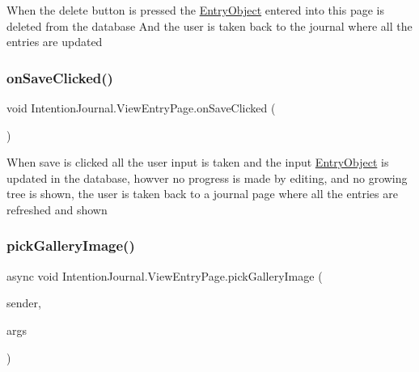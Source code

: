 When the delete button is pressed the \hyperlink{class_intention_journal_1_1_entry_object}{Entry\+Object} entered into this page is deleted from the database And the user is taken back to the journal where all the entries are updated 

\mbox{\label{class_intention_journal_1_1_view_entry_page_a42744fad9ae25e4b10a7a308e69545ce}} 
\subsubsection{\texorpdfstring{on\+Save\+Clicked()}{onSaveClicked()}}
{\footnotesize\ttfamily void Intention\+Journal.\+View\+Entry\+Page.\+on\+Save\+Clicked (\begin{DoxyParamCaption}{ }\end{DoxyParamCaption})\hspace{0.3cm}{\ttfamily [inline]}}



When save is clicked all the user input is taken and the input \hyperlink{class_intention_journal_1_1_entry_object}{Entry\+Object} is updated in the database, howver no progress is made by editing, and no growing tree is shown, the user is taken back to a journal page where all the entries are refreshed and shown 

\mbox{\label{class_intention_journal_1_1_view_entry_page_a2f172c5cd22210438c6c671a8c59022b}} 
\subsubsection{\texorpdfstring{pick\+Gallery\+Image()}{pickGalleryImage()}}
{\footnotesize\ttfamily async void Intention\+Journal.\+View\+Entry\+Page.\+pick\+Gallery\+Image (\begin{DoxyParamCaption}\item[{object}]{sender,  }\item[{Event\+Args}]{args }\end{DoxyParamCaption})\hspace{0.3cm}{\ttfamily [inline]}}



